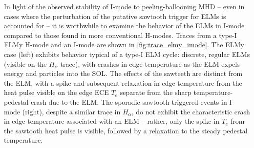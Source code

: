 \begin{figure}[h]
 \pushtooutside
\end{figure}

In light of the observed stability of I-mode to peeling-ballooning MHD -- even in cases where the perturbation of the putative sawtooth trigger for ELMs is accounted for -- it is worthwhile to examine the behavior of the ELMs in I-mode compared to those found in more conventional H-modes.  Traces from a type-I ELMy H-mode and an I-mode are shown in \cref{fig:trace_elmy_imode}.  The ELMy case (left) exhibits behavior typical of a type-I ELM cycle: discrete, regular ELMs (visible on the $H_\alpha$ trace), with crashes in edge temperature as the ELM expels energy and particles into the SOL.  The effects of the sawteeth are distinct from the ELM, with a spike and subsequent relaxation in edge temperature from the heat pulse visible on the edge ECE $T_e$ separate from the sharp temperature-pedestal crash due to the ELM.  The sporadic sawtooth-triggered events in I-mode (right), despite a similar trace in $H_\alpha$, do not exhibit the characteristic crash in edge temperature associated with an ELM -- rather, only the spike in $T_e$ from the sawtooth heat pulse is visible, followed by a relaxation to the steady pedestal temperature.

